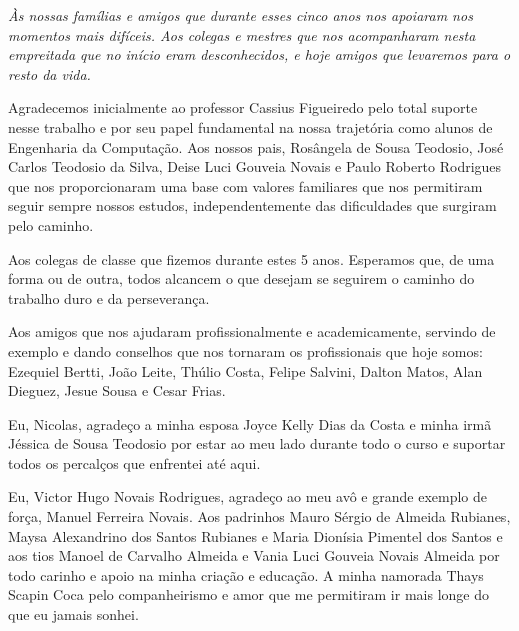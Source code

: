 \cleardoublepage
\thispagestyle{empty}
\vspace*{200mm}

\begin{flushright}
{\em 
Às nossas famílias e amigos que durante esses cinco anos nos apoiaram nos momentos mais difíceis.
Aos colegas e mestres que nos acompanharam nesta empreitada que no início eram desconhecidos, e hoje amigos que levaremos para o resto da vida.
}
\end{flushright}
\newpage


\hspace{5mm}
Agradecemos inicialmente ao professor Cassius Figueiredo pelo total suporte nesse trabalho e por seu papel fundamental na nossa trajetória como alunos de Engenharia da Computação. Aos nossos pais, Rosângela de Sousa Teodosio, José Carlos Teodosio da Silva, Deise Luci Gouveia Novais e Paulo Roberto Rodrigues que nos proporcionaram uma base com valores familiares que nos permitiram seguir sempre nossos estudos, independentemente das dificuldades que surgiram pelo caminho.

Aos colegas de classe que fizemos durante estes 5 anos. Esperamos que, de uma forma ou de outra, todos alcancem o que desejam se seguirem o caminho do trabalho duro e da perseverança.

Aos amigos que nos ajudaram profissionalmente e academicamente, servindo de exemplo e dando conselhos que nos tornaram os profissionais que hoje somos: Ezequiel Bertti, João Leite, Thúlio Costa, Felipe Salvini, Dalton Matos, Alan Dieguez, Jesue Sousa e Cesar Frias.

Eu, Nicolas, agradeço a minha esposa Joyce Kelly Dias da Costa e minha irmã Jéssica de Sousa Teodosio por estar ao meu lado durante todo o curso e suportar todos os percalços que enfrentei até aqui.

Eu, Victor Hugo Novais Rodrigues, agradeço ao meu avô e grande exemplo de força, Manuel Ferreira Novais. Aos padrinhos Mauro Sérgio de Almeida Rubianes, Maysa Alexandrino dos Santos Rubianes e Maria Dionísia Pimentel dos Santos e aos tios Manoel de Carvalho Almeida e Vania Luci Gouveia Novais Almeida por todo carinho e apoio na minha criação e educação. A minha namorada Thays Scapin Coca pelo companheirismo e amor que me permitiram ir mais longe do que eu jamais sonhei.

